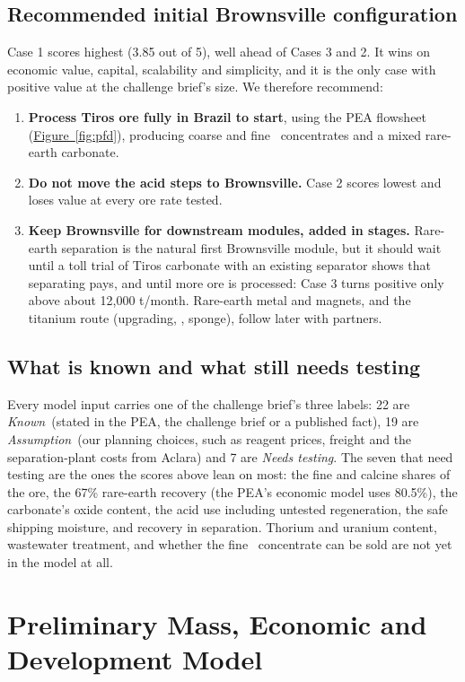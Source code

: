 \documentclass[11pt,letterpaper]{article}
\newcommand{\known}{\textit{\textcolor{oxide}{Known}}}
\newcommand{\assume}{\textit{\textcolor{amber}{Assumption}}}
\newcommand{\test}{\textit{\textcolor{brick}{Needs testing}}}
\newcommand{\tio}{\ce{TiO2}}
\newcommand{\fref}[1]{\hyperref[#1]{Figure~\ref*{#1}}}
\begin{document}
\subsection{Recommended initial Brownsville configuration}\label{sec:recommend}
Case 1 scores highest (3.85 out of 5), well ahead of Cases 3 and 2. It wins on economic value, capital, scalability and simplicity, and it is the only case with positive value at the challenge brief's size. We therefore recommend:
\begin{enumerate}[itemsep=1pt]
\item \textbf{Process Tiros ore fully in Brazil to start}, using the PEA flowsheet (\fref{fig:pfd}), producing coarse and fine \tio\ concentrates and a mixed rare-earth carbonate.
\item \textbf{Do not move the acid steps to Brownsville.} Case 2 scores lowest and loses value at every ore rate tested.
\item \textbf{Keep Brownsville for downstream modules, added in stages.} Rare-earth separation is the natural first Brownsville module, but it should wait until a toll trial of Tiros carbonate with an existing separator shows that separating pays, and until more ore is processed: Case 3 turns positive only above about 12,000 t/month. Rare-earth metal and magnets, and the titanium route (upgrading, , sponge), follow later with partners.
\end{enumerate}

\subsection{What is known and what still needs testing}\label{sec:known}
Every model input carries one of the challenge brief's three labels: 22 are \known\ (stated in the PEA, the challenge brief or a published fact), 19 are \assume\ (our planning choices, such as reagent prices, freight and the separation-plant costs from Aclara) and 7 are \test. The seven that need testing are the ones the scores above lean on most: the fine and calcine shares of the ore, the 67\% rare-earth recovery (the PEA's economic model uses 80.5\%), the carbonate's oxide content, the acid use including untested regeneration, the safe shipping moisture, and recovery in separation. Thorium and uranium content, wastewater treatment, and whether the fine \tio\ concentrate can be sold are not yet in the model at all.

\section{Preliminary Mass, Economic and Development Model}\label{sec:model}
\end{document}
